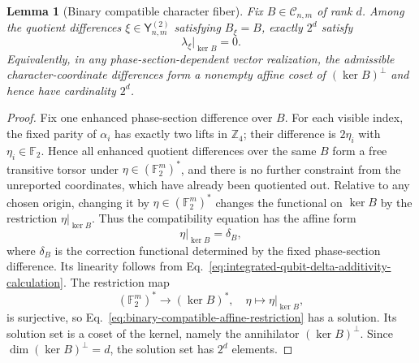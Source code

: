 \documentclass[11pt]{article}
\newcommand{\F}{\mathbb F}
\newcommand{\1}{\mathbf 1}
\theoremstyle{plain}
\newtheorem{lemma}[theorem]{Lemma}
\theoremstyle{definition}
\theoremstyle{remark}
\begin{document}
\begin{lemma}[Binary compatible character fiber]
\label{lem:binary-compatible-character-fiber}
Fix $B\in\mathcal C_{n,m}$ of rank $d$.  Among the quotient differences
$\xi\in\mathsf Y_{n,m}^{(2)}$ satisfying $B_\xi=B$, exactly $2^d$ satisfy
\begin{equation}
 \lambda_\xi|_{\ker B}=0.
 \label{eq:binary-compatible-affine-fiber-condition}
\end{equation}
Equivalently, in any phase-section-dependent vector realization, the admissible
character-coordinate differences form a nonempty affine coset of
$(\ker B)^\perp$ and hence have cardinality $2^d$.
\end{lemma}
\begin{proof}
Fix one enhanced phase-section difference over $B$.  For each visible index,
the fixed parity of $\alpha_i$ has exactly two lifts in $\mathbb Z_4$;
their difference is $2\eta_i$ with $\eta_i\in\F_2$.  Hence all enhanced
quotient differences over the same $B$ form a free transitive torsor under
$\eta\in(\F_2^m)^*$, and there is no further constraint from the unreported
coordinates, which have already been quotiented out.  Relative to any chosen origin, changing it by
$\eta\in(\F_2^m)^*$ changes the functional on $\ker B$ by the restriction
$\eta|_{\ker B}$.  Thus the compatibility equation has the affine form
\begin{equation}
 \eta|_{\ker B}=\delta_B,
 \label{eq:binary-compatible-affine-restriction}
\end{equation}
where $\delta_B$ is the correction functional determined by the fixed
phase-section difference.  Its linearity follows from
Eq.~\eqref{eq:integrated-qubit-delta-additivity-calculation}.  The restriction
map
\begin{equation}
 (\F_2^m)^*\longrightarrow(\ker B)^*,
 \quad \eta\longmapsto\eta|_{\ker B},
 \label{eq:binary-character-restriction-map}
\end{equation}
is surjective, so Eq.~\eqref{eq:binary-compatible-affine-restriction} has a
solution.  Its solution set is a coset of the kernel, namely the annihilator
$(\ker B)^\perp$.  Since
$\dim(\ker B)^\perp=d$, the solution set has $2^d$ elements.
\end{proof}
\end{document}
